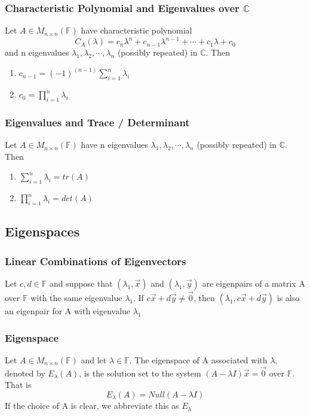 \documentclass[12pt, letterpaper]{article}
\begin{document}
\subsubsection{Characteristic Polynomial and Eigenvalues over $\mathbb{C}$}
Let $A\in M_{n\times n}(\mathbb{F})$ have characteristic polynomial
\[C_A(\lambda) = c_n\lambda^n + c_{n-1}\lambda^{n-1}+\cdots+c_1\lambda + c_0\]
and n eigenvalues $\lambda_1, \lambda_2, \cdots, \lambda_n$ (possibly repeated) in $\mathbb{C}$. Then 
\begin{enumerate}
    \item $c_{n-1} = (-1)^{(n-1)}\displaystyle\sum_{i=1}^{n}\lambda_i$ 
    \item $c_0 = \prod_{i=1}^{n}\lambda_i$
\end{enumerate}
\subsubsection{Eigenvalues and Trace / Determinant}
Let $A\in M_{n\times n}(\mathbb{F})$ have n eigenvalues $\lambda_1, \lambda_2, \cdots, \lambda_n$ (possibly repeated) in $\mathbb{C}$. Then 
\begin{enumerate}
    \item $\displaystyle\sum_{i=1}^{n}\lambda_i = tr(A)$
    \item $\displaystyle\prod_{i=1}^{n}\lambda_i = det(A)$
\end{enumerate}
\subsection{Eigenspaces}
\subsubsection{Linear Combinations of Eigenvectors}
Let $c,d\in\mathbb{F}$ and suppose that $(\lambda_1, \vec{x})$ and $(\lambda_1, \vec{y})$ are 
eigenpairs of a matrix A over $\mathbb{F}$ with the same eigenvalue $\lambda_1$. If $c\vec{x} + d\vec{y}\neq \vec{0}$,
then $(\lambda_1, c\vec{x} + d\vec{y})$ is also an eigenpair for A with eigenvalue $\lambda_1$
\subsubsection{Eigenspace}
Let $A\in M_{n\times n}(\mathbb{F})$ and let $\lambda\in\mathbb{F}$. The eigenspace of A associated with $\lambda$, denoted by $E_\lambda(A)$, 
is the solution set to the system $(A - \lambda I)\vec{x} = \vec{0}$ over $\mathbb{F}$. That is
\[E_\lambda(A) = Null(A-\lambda I)\]
If the choice of A is clear, we abbreviate this as $E_\lambda$
\end{document}
